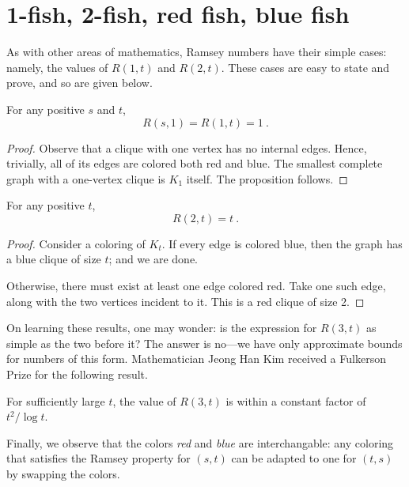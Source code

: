 \documentclass{article}
\begin{document}
\section{1-fish, 2-fish, red fish, blue fish}

As with other areas of mathematics, Ramsey numbers have their simple cases: namely, the values of $R(1,t)$ and $R(2,t)$. These cases are easy to state and prove, and so are given below.

\begin{Proposition}
    For any positive $s$ and $t$,
    \[ R(s,1) = R(1,t) = 1 \ . \]
\end{Proposition}

\begin{proof}
    Observe that a clique with one vertex has no internal edges. Hence, trivially, all of its edges are colored both red and blue. The smallest complete graph with a one-vertex clique is $K_1$ itself. The proposition follows.
\end{proof}

\begin{Proposition}
    For any positive $t$,
    \[ R(2,t) = t \ . \]
\end{Proposition}

\begin{proof}
    Consider a coloring of $K_t$. If every edge is colored blue, then the graph has a blue clique of size $t$; and we are done.

    Otherwise, there must exist at least one edge colored red. Take one such edge, along with the two vertices incident to it. This is a red clique of size 2.
\end{proof}

On learning these results, one may wonder: is the expression for $R(3,t)$ as simple as the two before it? The answer is no---we have only approximate bounds for numbers of this form. Mathematician Jeong Han Kim received a Fulkerson Prize for the following result.

\begin{Theorem} \label{kims_theorem}
    For sufficiently large $t$, the value of $R(3,t)$ is within a constant factor of $t^2/\log t$.
\end{Theorem}

Finally, we observe that the colors \emph{red} and \emph{blue} are interchangable: any coloring that satisfies the Ramsey property for $(s,t)$ can be adapted to one for $(t,s)$ by swapping the colors.
\end{document}
